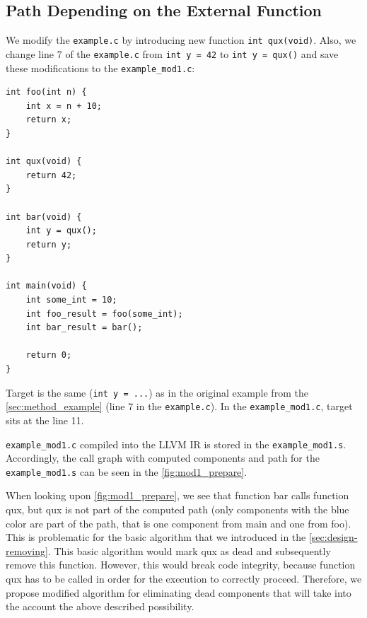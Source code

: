 \documentclass[12pt, twoside]{fithesis2}
\renewcommand{\_}{\leavevmode \kern0.07em\vbox{\hrule width0.4em}}
\begin{document}
\subsection{Path Depending on the External Function}
\label{subsec:path_function}

We modify the \texttt{example.c} by introducing new function
\texttt{int qux(void)}. Also, we change line 7 of the
\texttt{example.c} from
\texttt{int y = 42} to \texttt{int y = qux()} and save these
modifications to the \texttt{example_mod1.c}:

\begin{verbatim}
int foo(int n) {
    int x = n + 10;
    return x;
}

int qux(void) {
    return 42;
}

int bar(void) {
    int y = qux();
    return y;
}

int main(void) {
    int some_int = 10;
    int foo_result = foo(some_int);
    int bar_result = bar();

    return 0;
}
\end{verbatim}

Target is the same (\texttt{int y = ...})
as in the original example from the
\autoref{sec:method_example} (line 7 in the \texttt{example.c}).
In the \texttt{example_mod1.c}, target sits at the line 11.

\texttt{example_mod1.c} compiled into the LLVM IR
is stored in the \texttt{example_mod1.s}.
Accordingly, the call graph with computed components and path for the
\texttt{example_mod1.s} can be seen in the
\autoref{fig:mod1_prepare}.

When looking upon \autoref{fig:mod1_prepare}, we see that function bar calls
function qux, but qux is not part of the computed path (only components with
the blue color are part of the path, that is one component from main and one
from foo). This is problematic for the basic algorithm that we introduced
in the \autoref{sec:design-removing}. This basic algorithm would mark
qux as dead and subsequently remove this function. However, this would break
code integrity, because function qux has to be called in order for the execution
to correctly proceed.
Therefore, we propose modified algorithm for eliminating dead components that
will take into the account the above described possibility.
\end{document}
